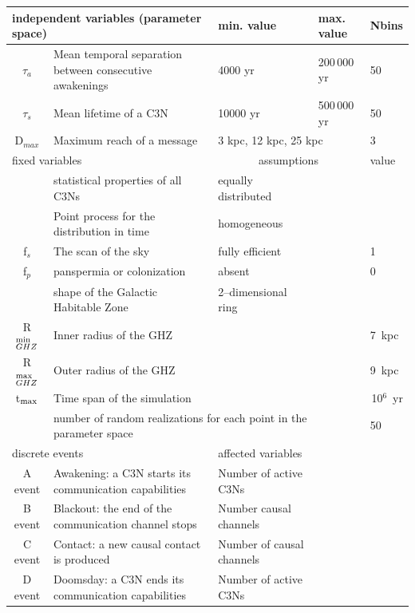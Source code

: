 \documentclass[crop]{CSLB}
\newcommand{\ceti}{C3N}
\newcommand{\cetis}{C3Ns}
\begin{document}
 \setlength{\tabcolsep}{10pt}
\begin{table}
\centering
\begin{tabular}{cllll}
\hline
   \multicolumn{2}{l}{independent variables (parameter space)}
   &min. value&max. value&Nbins\\
\hline

   $\tau_{a}$ & Mean temporal separation between consecutive
   awakenings & 4000 yr & 200\,000 yr & 50\\ 
   $\tau_{s}$ & Mean lifetime of a \ceti{}
   & 10000 yr & 500\,000 yr& 50\\ 
   D$_{max}$ & Maximum reach of a message  &  \multicolumn{2}{l}{3 kpc, 12 kpc, 25 kpc} & 3\\
\hline 

   \multicolumn{2}{l}{fixed variables} & \multicolumn{2}{c}{assumptions} &value \\
\hline
   & statistical properties of all \cetis{} &equally distributed&&\\
   & Point process for the distribution in time & homogeneous &&\\
   f$_s$ & The scan of the sky & fully efficient&&1\\
   f$_p$ & panspermia or colonization &absent&&0\\
   & shape of the Galactic Habitable Zone & 2--dimensional ring &&\\
	R$_{GHZ}^{\rm min}$   & Inner radius of the GHZ  & \citet{lineweaver_galactic_2004} & & 7~kpc\\
   R$_{GHZ}^{\rm max}$   & Outer radius of the GHZ       & \citet{lineweaver_galactic_2004} & & 9~kpc\\
	t$_{\rm max}$ & Time span of the simulation  & & \multicolumn{2}{r}{10$^6$~yr} \\
    & \multicolumn{3}{l}{number of random realizations for each point
    in the parameter space} & 50 \\
\hline
   \multicolumn{2}{l}{discrete events} &
   \multicolumn{3}{l}{affected variables}\\
\hline
   A event & Awakening: a \ceti{} starts its communication
   capabilities &Number of active \cetis{}\\
   B event & Blackout: the end of the communication channel stops
   &Number causal channels\\
   C event & Contact: a new causal contact is produced &Number of causal channels\\
   D event & Doomsday: a \ceti{} ends its communication capabilities&Number of active \cetis{}\\
\hline


\end{tabular}
\end{table}
\end{document}
